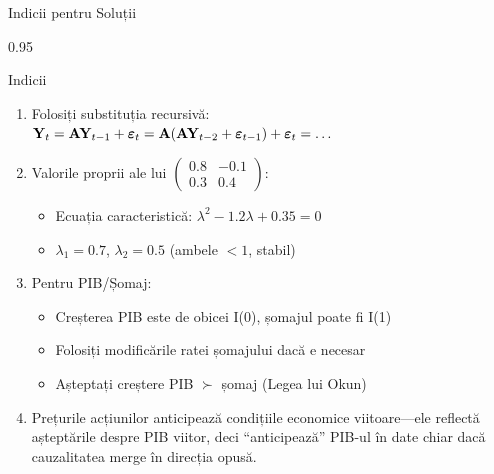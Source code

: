 \documentclass[9pt, aspectratio=169, t]{beamer}
\begin{document}
\begin{frame}{Indicii pentru Soluții}
    \begin{cminipage}{0.95\textwidth}
    {\footnotesize
    \begin{block}{Indicii}
        \begin{enumerate}\setlength{\itemsep}{1pt}
            \item Folosiți substituția recursivă: $\mathbf{Y}_t = \mathbf{A}\mathbf{Y}_{t-1} + \boldsymbol{\varepsilon}_t = \mathbf{A}(\mathbf{A}\mathbf{Y}_{t-2} + \boldsymbol{\varepsilon}_{t-1}) + \boldsymbol{\varepsilon}_t = \ldots$

            \item Valorile proprii ale lui $\begin{pmatrix} 0.8 & -0.1 \\ 0.3 & 0.4 \end{pmatrix}$:
                \begin{itemize}\setlength{\itemsep}{0pt}
                    \item Ecuația caracteristică: $\lambda^2 - 1.2\lambda + 0.35 = 0$
                    \item $\lambda_1 = 0.7$, $\lambda_2 = 0.5$ (ambele $< 1$, stabil)
                \end{itemize}

            \item Pentru PIB/Șomaj:
                \begin{itemize}\setlength{\itemsep}{0pt}
                    \item Creșterea PIB este de obicei I(0), șomajul poate fi I(1)
                    \item Folosiți modificările ratei șomajului dacă e necesar
                    \item Așteptați creștere PIB $\succ$ șomaj (Legea lui Okun)
                \end{itemize}

            \item Prețurile acțiunilor anticipează condițiile economice viitoare---ele reflectă așteptările despre PIB viitor, deci ``anticipează'' PIB-ul în date chiar dacă cauzalitatea merge în direcția opusă.
        \end{enumerate}
    \end{block}
    }
    \end{cminipage}
\end{frame}
\end{document}
